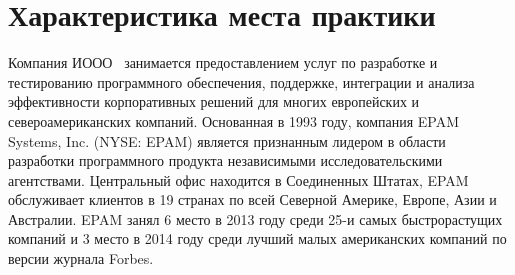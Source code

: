 \section{Характеристика места практики}
\label{sec:practice:company_characteristics}

Компания ИООО~\company{} занимается предоставлением услуг по разработке и тестированию программного обеспечения, поддержке, интеграции и анализа эффективности корпоративных решений для многих европейских и североамериканских компаний.
Основанная в 1993 году, компания EPAM Systems, Inc. (NYSE: EPAM) является признанным лидером в области разработки программного продукта независимыми исследовательскими агентствами. Центральный офис находится в Соединенных Штатах, EPAM обслуживает клиентов в 19 странах по всей Северной Америке, Европе, Азии и Австралии.
EPAM занял 6 место в 2013 году среди 25-и самых быстрорастущих компаний и 3 место в 2014 году среди лучший малых американских компаний по версии журнала Forbes.

